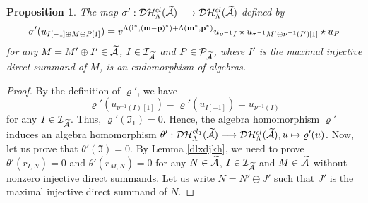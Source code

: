 \documentclass[reqno,12pt]{amsart}
\numberwithin{equation}{section}
\def\P{\mathcal{P}}\def\I{\mathcal{I}}\def\X{\mathbb X}\def\T{\mathbb T}\def\e{\mbox{\rm e}}
\theoremstyle{plain} %
\newtheorem{proposition}[theorem]{\bf Proposition}
\theoremstyle{definition} %
\begin{document}
\begin{proposition}
The map $\sigma':\mathcal {D}\mathcal {H}_\Lambda^{{cl}}(\widetilde{\mathcal{A}})\longrightarrow\mathcal {D}\mathcal {H}_\Lambda^{{cl}}(\widetilde{\mathcal{A}})$ defined by
$$\sigma'(u_{I[-1]\oplus M\oplus P[1]})=v^{\Lambda({\bf i}^\ast,({\bf m}-{\bf p})^\ast)+\Lambda({\bf m}^\ast,{\bf p}^\ast)}u_{\nu^{-1}I}\star u_{\tau^{-1} M'\oplus \nu^{-1}(I')[1]}\star u_{P}$$ for any $M=M'\oplus I'\in\widetilde{\mathcal{A}}$, $I\in\I_{\widetilde{\A}}$ and $P\in\P_{\widetilde{\A}}$, where $I'$ is the maximal injective direct summand of $M$, is an endomorphism of algebras.
\end{proposition}
\begin{proof}
By the definition of $\varrho'$, we have $$\varrho'(u_{\nu^{-1}(I)[1]})=\varrho'(u_{I[-1]})=u_{\nu^{-1}(I)}$$ for any $I\in\I_{\widetilde{\A}}$. Thus, $\varrho'(\mathfrak{I}_1)=0$. Hence, the algebra homomorphism $\varrho'$ induces an algebra homomorphism $\theta':\mathcal {D}\mathcal {H}_\Lambda^{{cl}_1}(\widetilde{\mathcal{A}})\longrightarrow\mathcal {D}\mathcal {H}_\Lambda^{{cl}}(\widetilde{\mathcal{A}}), u\mapsto \varrho'(u)$.
Now, let us prove that $\theta'(\mathfrak{I})=0$. By Lemma \ref{dlxdjkh}, we need to prove $\theta'(r_{I,N})=0$ and $\theta'(r_{M,N})=0$ for any $N\in{\widetilde{\mathcal{A}}}$, $I\in \mathcal{I}_{\widetilde{\mathcal{A}}}$ and $M\in{\widetilde{\mathcal{A}}}$ without nonzero injective direct summands. Let us write $N=N'\oplus J'$ such that $J'$ is the maximal injective direct summand of $N$.


\end{proof}
\end{document}
